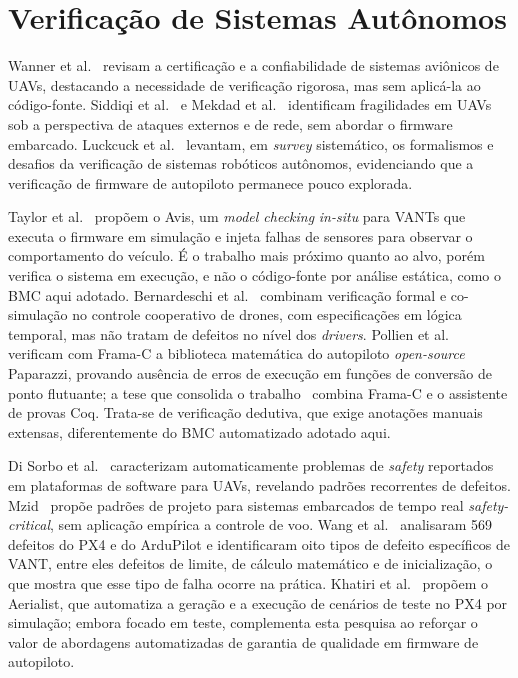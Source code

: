 
\section{Verificação de Sistemas Autônomos}
\label{sec:rel-autonomos}

Wanner et al.~\cite{Wanner2024} revisam a certificação e a confiabilidade de
sistemas aviônicos de UAVs, destacando a necessidade de verificação rigorosa, mas
sem aplicá-la ao código-fonte. Siddiqi et al.~\cite{Siddiqi2022} e Mekdad et
al.~\cite{Mekdad2023} identificam fragilidades em UAVs sob a perspectiva de
ataques externos e de rede, sem abordar o firmware embarcado.
Luckcuck et al.~\cite{Luckcuck2019} levantam, em \textit{survey} sistemático, os
formalismos e desafios da verificação de sistemas robóticos autônomos,
evidenciando que a verificação de firmware de autopiloto permanece pouco
explorada.

Taylor et al.~\cite{Taylor2021} propõem o Avis, um \textit{model checking}
\textit{in-situ} para VANTs que executa o firmware em simulação e injeta falhas
de sensores para observar o comportamento do veículo. É o trabalho mais próximo
quanto ao alvo, porém verifica o sistema em execução, e não o código-fonte por
análise estática, como o BMC aqui adotado. Bernardeschi et
al.~\cite{Bernardeschi2023} combinam verificação formal e co-simulação no
controle cooperativo de drones, com especificações em lógica temporal, mas não
tratam de defeitos no nível dos \textit{drivers}. Pollien et
al.~\cite{Pollien2021} verificam com Frama-C a biblioteca matemática do
autopiloto \textit{open-source} Paparazzi, provando ausência de erros de execução
em funções de conversão de ponto flutuante; a tese que consolida o
trabalho~\cite{Pollien2023} combina Frama-C e o assistente de provas Coq. Trata-se
de verificação dedutiva, que exige anotações manuais extensas, diferentemente do
BMC automatizado adotado aqui.

Di Sorbo et al.~\cite{deSorbo2022} caracterizam automaticamente problemas de
\textit{safety} reportados em plataformas de software para UAVs, revelando
padrões recorrentes de defeitos. Mzid~\cite{Mzid2024} propõe padrões de projeto
para sistemas embarcados de tempo real \textit{safety-critical}, sem aplicação
empírica a controle de voo. Wang et al.~\cite{Wang2021} analisaram 569 defeitos do PX4 e do ArduPilot e
identificaram oito tipos de defeito específicos de VANT, entre eles defeitos de limite,
de cálculo matemático e de inicialização, o que mostra que esse tipo de falha ocorre
na prática. Khatiri et al.~\cite{Khatiri2024} propõem o
Aerialist, que automatiza a geração e a execução de cenários de teste no PX4 por
simulação; embora focado em teste, complementa esta pesquisa ao reforçar o valor
de abordagens automatizadas de garantia de qualidade em firmware de autopiloto.

